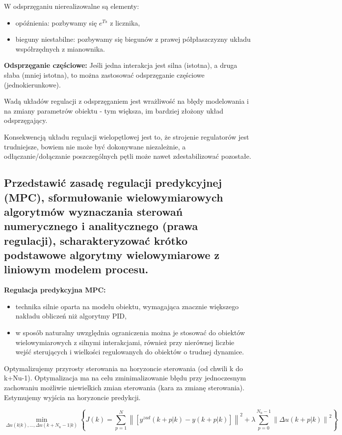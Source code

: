 W odsprzęganiu nierealizowalne są elementy:
\begin{itemize}
    \item opóźnienia: pozbywamy się $e^{Ts}$ z licznika,
    \item bieguny niestabilne: pozbywamy się biegunów z prawej półpłaszczyzny układu współrzędnych z mianownika.
\end{itemize}

\textbf{Odsprzęganie częściowe:}
Jeśli jedna interakcja jest silna (istotna), a druga słaba (mniej istotna), to można zastosować odsprzęganie częściowe (jednokierunkowe).

Wadą układów regulacji z odsprzęganiem jest wrażliwość na błędy modelowania i na zmiany parametrów obiektu - tym większa, im bardziej złożony układ odsprzęgający.

Konsekwencją układu regulacji wielopętlowej jest to, że strojenie regulatorów jest trudniejsze, bowiem nie może być dokonywane niezależnie, a odłączanie/dołączanie poszczególnych pętli może nawet zdestabilizować pozostałe.

\subsection{Przedstawić zasadę regulacji predykcyjnej (MPC), sformułowanie wielowymiarowych algorytmów wyznaczania sterowań numerycznego i analitycznego (prawa regulacji), scharakteryzować krótko podstawowe algorytmy wielowymiarowe z liniowym modelem procesu.}
\textbf{Regulacja predykcyjna MPC:}
\begin{itemize}
    \item technika silnie oparta na modelu obiektu, wymagająca znacznie większego nakładu obliczeń niż algorytmy PID,
    \item w sposób naturalny uwzględnia ograniczenia można je stosować do obiektów wielowymiarowych z silnymi interakcjami, również przy nierównej liczbie wejść sterujących i wielkości regulowanych do obiektów o trudnej dynamice.
\end{itemize}

Optymalizujemy przyrosty sterowania na horyzoncie sterowania (od chwili k do k+Nu-1). Optymalizacja ma na celu zminimalizowanie błędu przy jednoczesnym zachowaniu możliwie niewielkich zmian sterowania (kara za zmianę sterowania). Estymujemy wyjścia na horyzoncie predykcji.

\begin{equation}
   \min_{\Delta u(k|k),...,\Delta u(k+N_u-1|k)} \left\{ J(k) = \sum_{p=1}^N \left\| \left[ y^{zad}(k+p|k) - y(k+p|k) \right]\right\|^2 + \lambda \sum_{p=0}^{N_u-1} \left\| \Delta u(k+p|k) \right\|^2 \right\} 
\end{equation}

